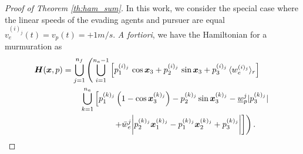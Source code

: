 \begin{proof}[Proof of Theorem \ref{th:ham_sum}]
In this work, we consider the special case where the linear speeds of the evading agents and pursuer are equal \ie $v_e^{(i)_j}(t) = v_p(t) = +1 m/s$.  
%
\textit{A fortiori}, we have the Hamiltonian for a murmuration as 
%
\begin{align}
	\bm{H}(\bm{x}, p) & = \bigcup_{j=1}^{n_f} \left( \bigcup_{i=1}^{n_a-1} 
	\left[p_1^{(i)_j} \,  \cos \bm{x}_3 + p_2^{(i)_j} \,  \sin \bm{x}_3 + p_3^{(i)_j}\, \langle w_e^{(i)_j}\rangle_r\right] \right.\nonumber \\
	& \qquad \left. \bigcup_{k=1}^{n_a} \left[
	p_1^{(k)_j} \left(1 - \cos \bm{x}_3^{(k)_j}\right) - p_2^{(k)_j} \sin \bm{x}_3^{(k)_j} - \underline{w}_p^j |p_3^{(k)_j}|   \right. \right. \nonumber \\
	& \qquad \qquad\qquad \left.  \left. 
	 + \bar{w}_e^j \bigg|p_2^{(k)_j} \bm{x}_1^{(k)_j} - p_1^{(k)_j}\bm{x}_2^{(k)_j} + p_3^{(k)_j}\bigg|
	 \right] \right).
\end{align}
\end{proof}